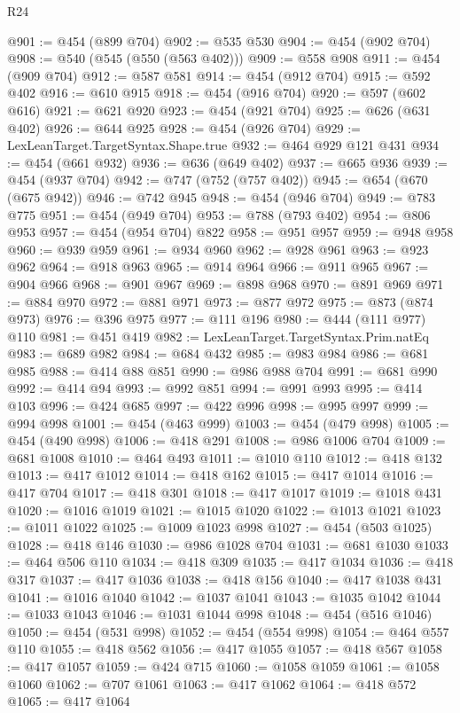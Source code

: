 \begin{lexlean}{R24}
\begin{coremodule}
@901 := @454 (@899 @704)
@902 := @535 @530
@904 := @454 (@902 @704)
@908 := @540 (@545 (@550 (@563 @402)))
@909 := @558 @908
@911 := @454 (@909 @704)
@912 := @587 @581
@914 := @454 (@912 @704)
@915 := @592 @402
@916 := @610 @915
@918 := @454 (@916 @704)
@920 := @597 (@602 @616)
@921 := @621 @920
@923 := @454 (@921 @704)
@925 := @626 (@631 @402)
@926 := @644 @925
@928 := @454 (@926 @704)
@929 := LexLeanTarget.TargetSyntax.Shape.true
@932 := @464 @929 @121 @431
@934 := @454 (@661 @932)
@936 := @636 (@649 @402)
@937 := @665 @936
@939 := @454 (@937 @704)
@942 := @747 (@752 (@757 @402))
@945 := @654 (@670 (@675 @942))
@946 := @742 @945
@948 := @454 (@946 @704)
@949 := @783 @775
@951 := @454 (@949 @704)
@953 := @788 (@793 @402)
@954 := @806 @953
@957 := @454 (@954 @704) @822
@958 := @951 @957
@959 := @948 @958
@960 := @939 @959
@961 := @934 @960
@962 := @928 @961
@963 := @923 @962
@964 := @918 @963
@965 := @914 @964
@966 := @911 @965
@967 := @904 @966
@968 := @901 @967
@969 := @898 @968
@970 := @891 @969
@971 := @884 @970
@972 := @881 @971
@973 := @877 @972
@975 := @873 (@874 @973)
@976 := @396 @975
@977 := @111 @196
@980 := @444 (@111 @977) @110
@981 := @451 @419
@982 := LexLeanTarget.TargetSyntax.Prim.natEq
@983 := @689 @982
@984 := @684 @432
@985 := @983 @984
@986 := @681 @985
@988 := @414 @88 @851
@990 := @986 @988 @704
@991 := @681 @990
@992 := @414 @94
@993 := @992 @851
@994 := @991 @993
@995 := @414 @103
@996 := @424 @685
@997 := @422 @996
@998 := @995 @997
@999 := @994 @998
@1001 := @454 (@463 @999)
@1003 := @454 (@479 @998)
@1005 := @454 (@490 @998)
@1006 := @418 @291
@1008 := @986 @1006 @704
@1009 := @681 @1008
@1010 := @464 @493
@1011 := @1010 @110
@1012 := @418 @132
@1013 := @417 @1012
@1014 := @418 @162
@1015 := @417 @1014
@1016 := @417 @704
@1017 := @418 @301
@1018 := @417 @1017
@1019 := @1018 @431
@1020 := @1016 @1019
@1021 := @1015 @1020
@1022 := @1013 @1021
@1023 := @1011 @1022
@1025 := @1009 @1023 @998
@1027 := @454 (@503 @1025)
@1028 := @418 @146
@1030 := @986 @1028 @704
@1031 := @681 @1030
@1033 := @464 @506 @110
@1034 := @418 @309
@1035 := @417 @1034
@1036 := @418 @317
@1037 := @417 @1036
@1038 := @418 @156
@1040 := @417 @1038 @431
@1041 := @1016 @1040
@1042 := @1037 @1041
@1043 := @1035 @1042
@1044 := @1033 @1043
@1046 := @1031 @1044 @998
@1048 := @454 (@516 @1046)
@1050 := @454 (@531 @998)
@1052 := @454 (@554 @998)
@1054 := @464 @557 @110
@1055 := @418 @562
@1056 := @417 @1055
@1057 := @418 @567
@1058 := @417 @1057
@1059 := @424 @715
@1060 := @1058 @1059
@1061 := @1058 @1060
@1062 := @707 @1061
@1063 := @417 @1062
@1064 := @418 @572
@1065 := @417 @1064

\end{coremodule}
\end{lexlean}
